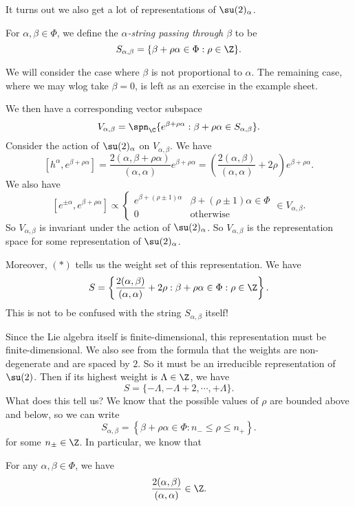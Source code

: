 \documentclass[a4paper]{article}
\begin{document}
It turns out we also get a lot of representations of $\su(2)_\alpha$.
\begin{defi}[String]
  For $\alpha, \beta \in \Phi$, we define the \emph{$\alpha$-string passing through $\beta$} to be
  \[
    S_{\alpha, \beta} = \{\beta + \rho\alpha \in \Phi: \rho \in \Z\}.
  \]
\end{defi}
We will consider the case where $\beta$ is not proportional to $\alpha$. The remaining case, where we may wlog take $\beta = 0$, is left as an exercise in the example sheet.

We then have a corresponding vector subspace
\[
  V_{\alpha, \beta} = \spn_\C\{e^{\beta + \rho \alpha}: \beta + \rho \alpha \in S_{\alpha,\beta}\}.
\]
Consider the action of $\su(2)_\alpha$ on $V_{\alpha, \beta}$. We have
\[
  [h^\alpha, e^{\beta + \rho \alpha}] = \frac{2(\alpha, \beta + \rho \alpha)}{(\alpha, \alpha)}e^{\beta + \rho \alpha} = \left(\frac{2 (\alpha, \beta)}{(\alpha, \alpha)} + 2\rho\right)e^{\beta + \rho \alpha}.\tag{$*$}
\]
We also have
\[
  [e^{\pm \alpha}, e^{\beta + \rho \alpha}] \propto
  \begin{cases}
    e^{\beta + (\rho \pm 1)\alpha} & \beta + (\rho \pm 1) \alpha \in \Phi\\
    0 & \text{otherwise}
  \end{cases} \in V_{\alpha, \beta}.
\]
So $V_{\alpha, \beta}$ is invariant under the action of $\su(2)_\alpha$. So $V_{\alpha, \beta}$ is the representation space for some representation of $\su(2)_\alpha$.

Moreover, $(*)$ tells us the weight set of this representation. We have
\[
  S = \left\{ \frac{2(\alpha , \beta)}{(\alpha, \alpha)} + 2\rho: \beta + \rho \alpha \in \Phi: \rho \in \Z\right\}.
\]
This is not to be confused with the string $S_{\alpha, \beta}$ itself!

Since the Lie algebra itself is finite-dimensional, this representation must be finite-dimensional. We also see from the formula that the weights are non-degenerate and are spaced by $2$. So it must be an irreducible representation of $\su(2)$. Then if its highest weight is $\Lambda \in \Z$, we have
\[
  S = \{-\Lambda, -\Lambda + 2, \cdots, +\Lambda\}.
\]
What does this tell us? We know that the possible values of $\rho$ are bounded above and below, so we can write
\[
  S_{\alpha, \beta} = \left\{ \beta + \rho \alpha \in \Phi: n_- \leq \rho \leq n_+\right\}.
\]
for some $n_{\pm} \in \Z$. In particular, we know that
\begin{prop}
  For any $\alpha, \beta \in \Phi$, we have
  \[
    \frac{2(\alpha, \beta)}{(\alpha,\alpha)} \in \Z.
  \]
\end{prop}
\end{document}

